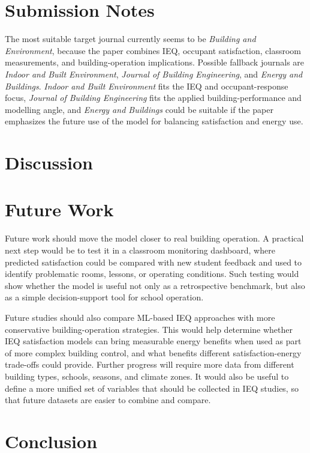 ﻿\documentclass[11pt]{article}
\newcommand{\Reviewed}[1]{\begingroup\color{black}#1\endgroup}
\newcommand{\supervisornote}[1]{\par\begingroup\color{gray}\small #1\par\endgroup}
\begin{document}
\section{Submission Notes}
\supervisornote{The most suitable target journal currently seems to be \textit{Building and Environment}, because the paper combines IEQ, occupant satisfaction, classroom measurements, and building-operation implications. Possible fallback journals are \textit{Indoor and Built Environment}, \textit{Journal of Building Engineering}, and \textit{Energy and Buildings}. \textit{Indoor and Built Environment} fits the IEQ and occupant-response focus, \textit{Journal of Building Engineering} fits the applied building-performance and modelling angle, and \textit{Energy and Buildings} could be suitable if the paper emphasizes the future use of the model for balancing satisfaction and energy use.}

\section{Discussion}

\Reviewed{
\section{Future Work}
Future work should move the model closer to real building operation. A practical next step would be to test it in a classroom monitoring dashboard, where predicted satisfaction could be compared with new student feedback and used to identify problematic rooms, lessons, or operating conditions. Such testing would show whether the model is useful not only as a retrospective benchmark, but also as a simple decision-support tool for school operation.

Future studies should also compare ML-based IEQ approaches with more conservative building-operation strategies. This would help determine whether IEQ satisfaction models can bring measurable energy benefits when used as part of more complex building control, and what benefits different satisfaction-energy trade-offs could provide. Further progress will require more data from different building types, schools, seasons, and climate zones. It would also be useful to define a more unified set of variables that should be collected in IEQ studies, so that future datasets are easier to combine and compare.}

\section{Conclusion}
\end{document}
